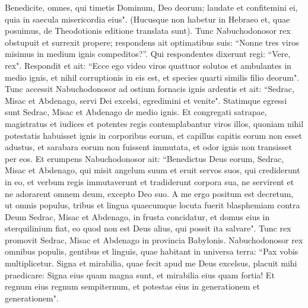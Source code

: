 \begin{biblechapter}
\verse Benedicite, omnes, qui timetis Dominum, Deo deorum; laudate et confitemini ei, quia in saecula misericordia eius". (Hucusque non habetur in Hebraeo et, quae posuimus, de Theodotionis editione translata sunt). 
\verse 
\verse Tunc Nabuchodonosor rex obstupuit et surrexit propere; respondens ait optimatibus suis: “Nonne tres viros misimus in medium ignis compeditos?”. Qui respondentes dixerunt regi: “Vere, rex". 
\verse 
\verse Respondit et ait: “Ecce ego video viros quattuor solutos et ambulantes in medio ignis, et nihil corruptionis in eis est, et species quarti similis filio deorum". 
\verse 
\verse Tunc accessit Nabuchodonosor ad ostium fornacis ignis ardentis et ait: “Sedrac, Misac et Abdenago, servi Dei excelsi, egredimini et venite". Statimque egressi sunt Sedrac, Misac et Abdenago de medio ignis. 
\verse 
\verse Et congregati satrapae, magistratus et iudices et potentes regis contemplabantur viros illos, quoniam nihil potestatis habuisset ignis in corporibus eorum, et capillus capitis eorum non esset adustus, et sarabara eorum non fuissent immutata, et odor ignis non transisset per eos. 
\verse 
\verse Et erumpens Nabuchodonosor ait: “Benedictus Deus eorum, Sedrac, Misac et Abdenago, qui misit angelum suum et eruit servos suos, qui crediderunt in eo, et verbum regis immutaverunt et tradiderunt corpora sua, ne servirent et ne adorarent omnem deum, excepto Deo suo. 
\verse 
\verse A me ergo positum est decretum, ut omnis populus, tribus et lingua quaecumque locuta fuerit blasphemiam contra Deum Sedrac, Misac et Abdenago, in frusta concidatur, et domus eius in sterquilinium fiat, eo quod non est Deus alius, qui possit ita salvare". 
\verse 
\verse Tunc rex promovit Sedrac, Misac et Abdenago in provincia Babylonis. 
\verse 
\verse Nabuchodonosor rex omnibus populis, gentibus et linguis, quae habitant in universa terra: “Pax vobis multiplicetur. 
\verse 
\verse Signa et mirabilia, quae fecit apud me Deus excelsus, placuit mihi praedicare: 
\verse 
\verse Signa eius quam magna sunt, et mirabilia eius quam fortia! Et regnum eius regnum sempiternum, et potestas eius in generationem et generationem". 
\end{biblechapter}

